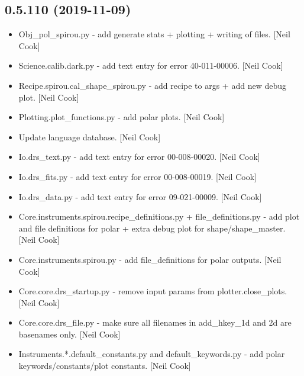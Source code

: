 \documentclass[a4paper,10pt,english]{report}
\begin{document}
\subsection{0.5.110 (2019-11-09)}
\label{\detokenize{misc/changelog:id31}}\begin{itemize}
\item {} 
Obj\_pol\_spirou.py - add generate stats + plotting + writing of files.
{[}Neil Cook{]}

\item {} 
Science.calib.dark.py - add text entry for error 40-011-00006. {[}Neil
Cook{]}

\item {} 
Recipe.spirou.cal\_shape\_spirou.py - add recipe to args + add new debug
plot. {[}Neil Cook{]}

\item {} 
Plotting.plot\_functions.py - add polar plots. {[}Neil Cook{]}

\item {} 
Update language database. {[}Neil Cook{]}

\item {} 
Io.drs\_text.py - add text entry for error 00-008-00020. {[}Neil Cook{]}

\item {} 
Io.drs\_fits.py - add text entry for error 00-008-00019. {[}Neil Cook{]}

\item {} 
Io.drs\_data.py - add text entry for error 09-021-00009. {[}Neil Cook{]}

\item {} 
Core.instruments.spirou.recipe\_definitions.py + file\_definitions.py -
add plot and file definitions for polar + extra debug plot for
shape/shape\_master. {[}Neil Cook{]}

\item {} 
Core.instruments.spirou.py - add file\_definitions for polar outputs.
{[}Neil Cook{]}

\item {} 
Core.core.drs\_startup.py - remove input params from
plotter.close\_plots. {[}Neil Cook{]}

\item {} 
Core.core.drs\_file.py - make sure all filenames in add\_hkey\_1d and 2d
are basenames only. {[}Neil Cook{]}

\item {} 
Instruments.*.default\_constants.py and default\_keywords.py - add polar
keywords/constants/plot constants. {[}Neil Cook{]}


\end{itemize}
\end{document}
